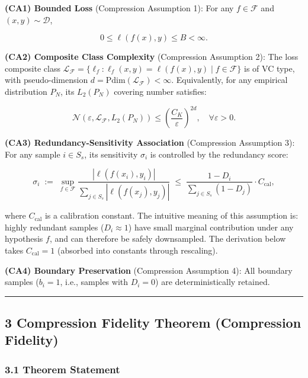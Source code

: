 \documentclass[
  12pt,
]{article}
\begin{document}
\textbf{(CA1) Bounded Loss} (Compression Assumption 1): For any
\(f \in \mathcal{F}\) and \((x, y) \sim \mathcal{D}\),

\[
0 \leq \ell(f(x), y) \leq B < \infty.
\]

\textbf{(CA2) Composite Class Complexity} (Compression Assumption 2): The loss composite class
\(\mathcal{L}_{\mathcal{F}} = \{\ell_f: \ell_f(x,y) = \ell(f(x), y) \mid f \in \mathcal{F}\}\)
is of VC type, with pseudo-dimension
\(d = \text{Pdim}(\mathcal{L}_{\mathcal{F}}) < \infty\). Equivalently, for any empirical distribution
\(P_N\), its \(L_2(P_N)\) covering number satisfies:

\[
\mathcal{N}(\varepsilon, \mathcal{L}_{\mathcal{F}}, L_2(P_N)) \leq \left(\frac{C_K}{\varepsilon}\right)^{2d}, \quad \forall \varepsilon > 0.
\tag{4}
\]

\textbf{(CA3) Redundancy-Sensitivity Association} (Compression Assumption 3): For any sample
\(i \in S_s\), its sensitivity \(\sigma_i\) is controlled by the redundancy score:

\[
\sigma_i \;:=\; \sup_{f \in \mathcal{F}} \frac{|\ell(f(x_i), y_i)|}{\sum_{j \in S_s} |\ell(f(x_j), y_j)|} \;\leq\; \frac{1 - D_i}{\sum_{j \in S_s} (1 - D_j)} \cdot C_{\text{cal}},
\tag{5}
\]

where \(C_{\text{cal}}\) is a calibration constant. The intuitive meaning of this assumption is: highly redundant samples (\(D_i \approx 1\)) have small marginal contribution under any hypothesis
\(f\), and can therefore be safely downsampled. The derivation below takes
\(C_{\text{cal}} = 1\) (absorbed into constants through rescaling).

\textbf{(CA4) Boundary Preservation} (Compression Assumption 4):
All boundary samples (\(b_i = 1\), i.e., samples with \(D_i = 0\)) are deterministically retained.

\begin{center}\rule{0.5\linewidth}{0.5pt}\end{center}

\subsection{3 Compression Fidelity Theorem (Compression Fidelity)}\label{compression-fidelity-theorem}

\subsubsection{3.1 Theorem Statement}\label{theorem-statement}
\end{document}
